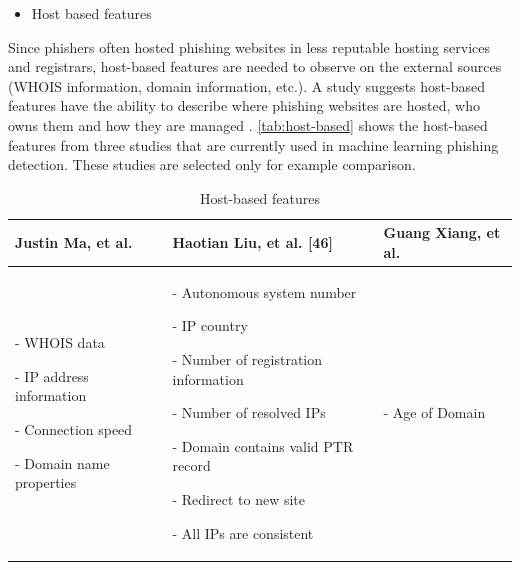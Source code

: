\begin{itemize}
\item Host based features
\end{itemize}
Since phishers often hosted phishing websites in less reputable hosting
services and registrars, host-based features are needed to observe
on the external sources (WHOIS information, domain information, etc.).
A study suggests host-based features have the ability to describe
where phishing websites are hosted, who owns them and how they are
managed \citep{ma:2009}. \autoref{tab:host-based} shows the host-based
features from three studies that are currently used in machine learning
phishing detection. These studies are selected only for example comparison.

\begin{table}
\centering{}%
\begin{tabular}{>{\raggedright}p{2cm}>{\raggedright}p{4cm}>{\raggedright}p{2cm}}
\toprule 
\textbf{\scriptsize{}Justin Ma, et al.\citep{ma:2009,ma2:2009}} & \textbf{\scriptsize{}Haotian Liu, et al. {[}46{]}\citep{liu}} & \textbf{\scriptsize{}Guang Xiang, et al. \citep{xiang:2011}}\tabularnewline
\midrule
\midrule 
{\scriptsize{}- WHOIS data}{\scriptsize \par}

{\scriptsize{}- IP address information}{\scriptsize \par}

{\scriptsize{}- Connection speed}{\scriptsize \par}

{\scriptsize{}- Domain name properties } & {\scriptsize{}- Autonomous system number }{\scriptsize \par}

{\scriptsize{}- IP country}{\scriptsize \par}

{\scriptsize{}- Number of registration information}{\scriptsize \par}

{\scriptsize{}- Number of resolved IPs}{\scriptsize \par}

{\scriptsize{}- Domain contains valid PTR record}{\scriptsize \par}

{\scriptsize{}- Redirect to new site}{\scriptsize \par}

{\scriptsize{}- All IPs are consistent} & {\scriptsize{}- Age of Domain}\tabularnewline
\bottomrule
\end{tabular}\protect\caption{\label{tab:host-based}Host-based features \citep{ma:2009,ma2:2009,liu,xiang:2011}}
\end{table}



